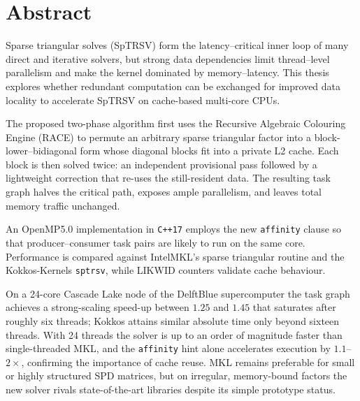 \chapter*{Abstract}

Sparse triangular solves (SpTRSV) form the latency–critical inner loop of many direct and iterative solvers, but strong data dependencies limit thread–level parallelism and make the kernel dominated by memory–latency.
This thesis explores whether redundant computation can be exchanged for improved data locality to accelerate SpTRSV on cache-based multi-core CPUs.

The proposed two-phase algorithm first uses the Recursive Algebraic Colouring Engine (RACE) to permute an arbitrary sparse triangular factor into a block-lower–bidiagonal form whose diagonal blocks fit into a private L2 cache.
Each block is then solved twice: an independent provisional pass followed by a lightweight correction that re-uses the still-resident data.
The resulting task graph halves the critical path, exposes ample parallelism, and leaves total memory traffic unchanged.

An OpenMP5.0 implementation in \texttt{C++17} employs the new \texttt{affinity} clause so that producer–consumer task pairs are likely to run on the same core.
Performance is compared against IntelMKL’s sparse triangular routine and the Kokkos-Kernels \texttt{sptrsv}, while LIKWID counters validate cache behaviour.

On a 24-core Cascade Lake node of the DelftBlue supercomputer the task graph achieves a strong-scaling speed-up between $1.25$ and $1.45$ that saturates after roughly six threads; Kokkos attains similar absolute time only beyond sixteen threads.
With 24 threads the solver is up to an order of magnitude faster than single-threaded MKL, and the \texttt{affinity} hint alone accelerates execution by $1.1$–$2\times$, confirming the importance of cache reuse.
MKL remains preferable for small or highly structured SPD matrices, but on irregular, memory-bound factors the new solver rivals state-of-the-art libraries despite its simple prototype status.


